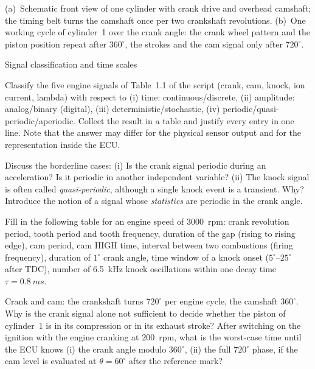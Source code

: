 \noindent (a)~Schematic front view of one cylinder with crank drive and
overhead camshaft; the timing belt turns the camshaft once per two crankshaft
revolutions. (b)~One working cycle of cylinder~1 over the crank angle: the
crank wheel pattern and the piston position repeat after $360^\circ$, the
strokes and the cam signal only after $720^\circ$.
\begin{exercise}{Signal classification and time scales}{\Paper}
\begin{tasks}
  \item Classify the five engine signals of Table~1.1 of the script (crank,
    cam, knock, ion current, lambda) with respect to
    (i) time: continuous/discrete, (ii) amplitude: analog/binary (digital),
    (iii) deterministic/stochastic, (iv) periodic/quasi-periodic/aperiodic.
    Collect the result in a table and justify every entry in one line. Note that the answer may differ for the
    physical sensor output and for the representation inside the ECU.
  \item Discuss the borderline cases: (i) Is the crank signal periodic
    during an acceleration? Is it periodic in another independent
    variable? (ii) The knock signal is often called
    \emph{quasi-periodic}, although a single knock event is a transient.
    Why?
    Introduce the notion of a signal whose \emph{statistics} are periodic
    in the crank angle.
  \item Fill in the following table for an engine speed of \SI{3000}{rpm}:
    crank revolution period, tooth period and tooth frequency, duration of the
    gap (rising to rising edge), cam period, cam HIGH time, interval between
    two combustions (firing frequency), duration of $1^\circ$ crank angle,
    time window of a knock onset ($5^\circ$--$25^\circ$ after TDC), number of
    \SI{6.5}{kHz} knock oscillations within one decay time
    $\tau=\SI{0.8}{ms}$.
  \item Crank and cam: the crankshaft turns $720^\circ$ per engine cycle,
    the camshaft $360^\circ$. Why is the crank signal alone not sufficient to
    decide whether the piston of cylinder~1 is in its compression or in its
    exhaust stroke? After switching on the ignition with the engine
    cranking at \SI{200}{rpm}, what is the worst-case time until the ECU knows
    (i) the crank angle modulo $360^\circ$, (ii) the full $720^\circ$ phase,
    if the cam level is evaluated at $\theta = 60^\circ$ after the reference
    mark?
\end{tasks}
\end{exercise}

